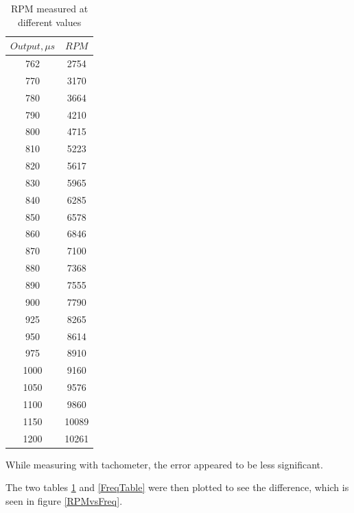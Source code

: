 \begin{table}[H]
\centering
\begin{tabular}{|c|c|}
\hline
$Output,\mu s$ 	& $RPM$ \\ \hline
762 			& 2754	\\ \hline
770				& 3170	\\ \hline
780				& 3664	\\ \hline
790				& 4210	\\ \hline
800 			& 4715  \\ \hline
810 			& 5223	\\ \hline
820 			& 5617  \\ \hline
830				& 5965 	\\ \hline
840				& 6285	\\ \hline
850 			& 6578	\\ \hline
860 			& 6846	\\ \hline
870 			& 7100	\\ \hline
880 			& 7368	\\ \hline
890 			& 7555	\\ \hline
900 			& 7790	\\ \hline
925 			& 8265	\\ \hline
950 			& 8614	\\ \hline
975 			& 8910	\\ \hline
1000 			& 9160	\\ \hline
1050 			& 9576	\\ \hline
1100 			& 9860	\\ \hline
1150 			& 10089	\\ \hline
1200			& 10261	\\ \hline
\end{tabular}
\caption{RPM measured at different values}
\label{RPMTable}
\end{table}

While measuring with tachometer, the error appeared to be less significant.

The two tables \ref{RPMTable} and \ref{FreqTable} were then plotted to see the difference, which is seen in figure \ref{RPMvsFreq}.

